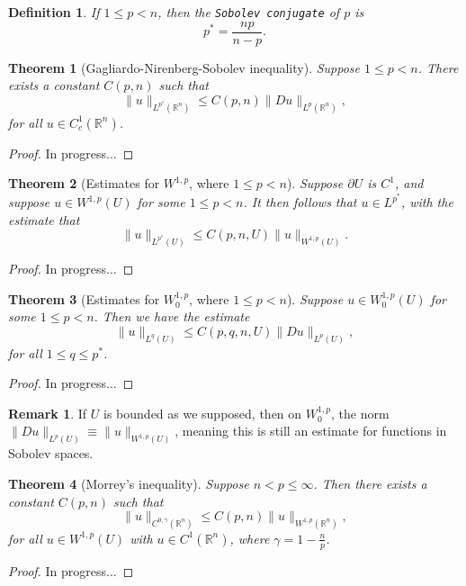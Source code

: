 \documentclass[11pt]{article}
\newtheorem{theorem}{Theorem}
\newtheorem{definition}{Definition}
\theoremstyle{definition}
\newtheorem*{remark}{Remark}
\begin{document}
\begin{definition}
	If $1 \leq p < n$, then the \texttt{Sobolev conjugate} of $p$ is
	\begin{equation*}
		p^* = \frac{np}{n-p}.
	\end{equation*}
\end{definition}

\begin{theorem}[Gagliardo-Nirenberg-Sobolev inequality]
Suppose $1\leq p < n$. There exists a constant $C(p,n)$ such that
	\[\|u\|_{L^{p^*}(\mathbb{R}^n)} \leq C(p,n)\|Du\|_{L^{p}(\mathbb{R}^n)},\]
for all $u \in C_{c}^{1}(\mathbb{R}^n)$.
\end{theorem}
\begin{proof}
In progress...
\end{proof}

\begin{theorem}[Estimates for $W^{1,p}$, where $1 \leq p < n$]
Suppose $\partial U$ is $C^1$,
and suppose $u \in W^{1,p}(U)$ for some $1 \leq p < n$. It then follows that $u \in L^{p^*}$, with the estimate that
	\[\|u\|_{L^{p^*}(U)} \leq C(p,n,U)\|u\|_{W^{1,p}(U)}.\]
\end{theorem}
\begin{proof}
In progress...
\end{proof}

\begin{theorem}[Estimates for $W_{0}^{1,p}$, where $1 \leq p < n$]
	Suppose $u \in W_{0}^{1,p}(U)$ for some $1 \leq p < n$. Then we have the estimate
	\[\|u\|_{L^{q}(U)} \leq C(p,q,n,U)\|Du\|_{L^{p}(U)},\]
	for all $1 \leq q \leq p^*$.
\end{theorem}
\begin{proof}
In progress...
\end{proof}

\begin{remark}
	If $U$ is bounded as we supposed, then on $W_{0}^{1,p}$, the norm $\|Du\|_{L^{p}(U)} \equiv \|u\|_{W^{1,p}(U)}$,
	meaning this is still an estimate for functions in Sobolev spaces.
\end{remark}

\begin{theorem}[Morrey's inequality]
Suppose $n < p \leq \infty$. Then there exists a constant $C(p,n)$ such that
	\[\|u\|_{C^{0,\gamma}(\mathbb{R}^n)} \leq C(p,n)\|u\|_{W^{1,p}(\mathbb{R}^n)},\]
for all $u \in W^{1,p}(U)$ with $u \in C^1(\mathbb{R}^n)$, where $\gamma = 1 - \frac{n}{p}$.
\end{theorem}
\begin{proof}
In progress...
\end{proof}
\end{document}
